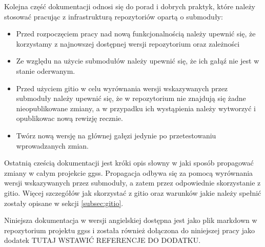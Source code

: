 Kolejna część dokumentacji odnosi się do porad i dobrych praktyk, które należy stosować pracując z infrastrukturą repozytoriów opartą o submoduły:
\begin{itemize}
    \item Przed rozpoczęciem pracy nad nową funkcjonalnością należy upewnić się, że korzystamy z najnowszej dostępnej wersji repozytorium oraz zależności
    \item Ze względu na użycie submodułów należy upewnić się, że ich gałąź nie jest w stanie oderwanym.
    \item Przed użyciem gitio w celu wyrównania wersji wskazywanych przez submoduły należy upewnić się, że w repozytorium nie znajdują się żadne nieopublikowane zmiany, a w przypadku ich wystąpienia należy wytworzyć i opublikowac nową rewizję recznie.
    \item Twórz nową wersję na głównej gałęzi jedynie po przetestowaniu wprowadzanych zmian.
\end{itemize}

Ostatnią cześcią dokumentacji jest króki opis słowny w jaki sposób propagować zmiany w całym projekcie ggss. Propagacja odbywa się za pomocą wyrównania wersji wskazywanych przez submoduły, a zatem przez odpowiednie skorzystanie z gitio. Więcej szczegółów jak skorzystać z gitio oraz warunków jakie należy spełnić zostały opisane w sekcji \ref{subsec:gitio}.

Niniejsza dokumentacja w wersji angielskiej dostępna jest jako plik markdown w repozytorium projektu ggss i została również dołączona do niniejszej pracy jako dodatek TUTAJ WSTAWIĆ REFERENCJE DO DODATKU.
